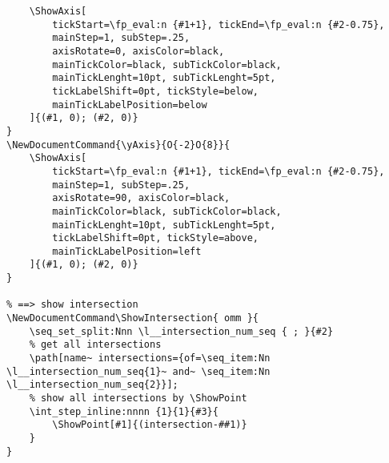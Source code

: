 \begin{verbatim}
    \ShowAxis[
        tickStart=\fp_eval:n {#1+1}, tickEnd=\fp_eval:n {#2-0.75}, 
        mainStep=1, subStep=.25, 
        axisRotate=0, axisColor=black,
        mainTickColor=black, subTickColor=black,
        mainTickLenght=10pt, subTickLenght=5pt,
        tickLabelShift=0pt, tickStyle=below, 
        mainTickLabelPosition=below
    ]{(#1, 0); (#2, 0)}
}
\NewDocumentCommand{\yAxis}{O{-2}O{8}}{
    \ShowAxis[
        tickStart=\fp_eval:n {#1+1}, tickEnd=\fp_eval:n {#2-0.75}, 
        mainStep=1, subStep=.25, 
        axisRotate=90, axisColor=black,
        mainTickColor=black, subTickColor=black,
        mainTickLenght=10pt, subTickLenght=5pt,
        tickLabelShift=0pt, tickStyle=above, 
        mainTickLabelPosition=left
    ]{(#1, 0); (#2, 0)}
}

% ==> show intersection
\NewDocumentCommand\ShowIntersection{ omm }{
    \seq_set_split:Nnn \l__intersection_num_seq { ; }{#2}
    % get all intersections
    \path[name~ intersections={of=\seq_item:Nn \l__intersection_num_seq{1}~ and~ \seq_item:Nn \l__intersection_num_seq{2}}]; 
    % show all intersections by \ShowPoint
    \int_step_inline:nnnn {1}{1}{#3}{
        \ShowPoint[#1]{(intersection-##1)}
    }
}
\end{verbatim}

